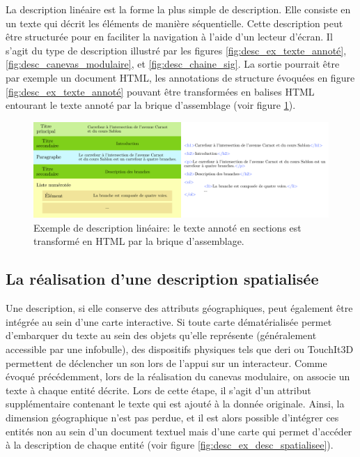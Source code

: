 \label{sec:description_textuelle}

La description linéaire est la forme la plus simple de description. Elle consiste en un texte qui décrit les éléments de manière séquentielle. Cette description peut être structurée pour en faciliter la navigation à l'aide d'un lecteur d'écran. Il s'agit du type de description illustré par les figures \ref{fig:desc_ex_texte_annoté}, \ref{fig:desc_canevas_modulaire}, et \ref{fig:desc_chaine_sig}. La sortie pourrait être par exemple un document HTML, les annotations de structure évoquées en figure \ref{fig:desc_ex_texte_annoté} pouvant être transformées en balises HTML entourant le texte annoté par la brique d'assemblage (voir figure \ref{fig:desc_ex_desc_lineaire}).

\begin{figure}[ht]
    \centering
    \includegraphics[width=\textwidth]{images/description/exemple_desc_lineaire.pdf
    }
    \caption[Exemple de description linéaire.]{Exemple de description linéaire: le texte annoté en sections est transformé en HTML par la brique d'assemblage.}
    \label{fig:desc_ex_desc_lineaire}
\end{figure}

\subsection{La réalisation d'une description spatialisée}

\label{sec:description_carte}

Une description, si elle conserve des attributs géographiques, peut également être intégrée au sein d'une carte interactive. Si toute carte dématérialisée permet d'embarquer du texte au sein des objets qu'elle représente (généralement accessible par une infobulle), des dispositifs physiques tels que \gls{deri} \citep{Brock2012} ou TouchIt3D \citep{barvir2021} permettent de déclencher un son lors de l'appui sur un interacteur. Comme évoqué précédemment, lors de la réalisation du canevas modulaire, on associe un texte à chaque entité décrite. Lors de cette étape, il s'agit d'un attribut supplémentaire contenant le texte qui est ajouté à la donnée originale. Ainsi, la dimension géographique n'est pas perdue, et il est alors possible d'intégrer ces entités non au sein d'un document textuel mais d'une carte qui permet d'accéder à la description de chaque entité (voir figure \ref{fig:desc_ex_desc_spatialisee}).

